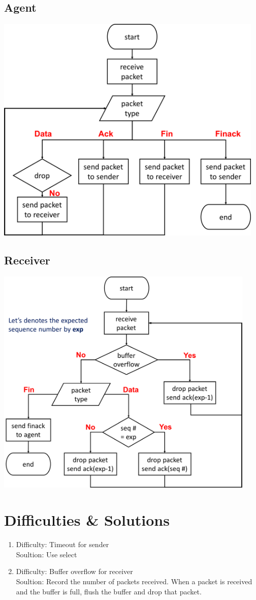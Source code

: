 \documentclass[12t, a4paper]{article}
\begin{document}
\begin{CJK}{UTF8}{bkai}
		\subsection*{Agent}
			\includegraphics[height=11cm, keepaspectratio=true]{agent.png}
		\subsection*{Receiver}
			\includegraphics[height=11cm, keepaspectratio=true]{receiver.png}

	\section*{Difficulties \& Solutions}
		\begin{enumerate}
		\item
			Difficulty: Timeout for sender \\
			Soultion: Use select
		\item
			Difficulty: Buffer overflow for receiver \\
			Soultion: Record the number of packets received. When a packet is received and the buffer is full, flush the buffer and drop that packet.
		\end{enumerate}
	
	\clearpage
	\end{CJK}
\end{document}
